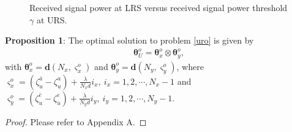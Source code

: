 \documentclass[10pt,final,doublecolumn]{IEEEtran}
\begin{document}
\begin{figure}[t!]
	\centering
	\subfigbottomskip=2pt
	\subfigcapskip=-5pt
	\caption{Received signal power at LRS versus received signal power threshold $\gamma$ at URS.}
\label{gain_N}
\end{figure}

{\bf{Proposition 1}}: The optimal solution to problem \eqref{uro} is given by
\begin{align}\label{so}
\boldsymbol{\theta}_U^o=\boldsymbol{\theta}_x^o\otimes\boldsymbol{\theta}_y^o,
\end{align}
with $\boldsymbol{\theta}_x^o=\mathbf{d}(N_x,\varsigma_x^o)$ and $\boldsymbol{\theta}_y^o
=\mathbf{d}(N_y,\varsigma_y^o)$, where
$\varsigma_x^o=(\zeta_u^{\bar{a}}-\zeta_u^{a})+\frac{\lambda}{N_x{d}}i_x,~i_x=1,2,\cdots,N_x-1$ and $\varsigma_y^o=(\zeta_u^{\bar{e}}-\zeta_u^{e})+\frac{\lambda}{N_y{d}}i_y,~i_y=1,2,\cdots,N_y-1$.
\begin{proof}
Please refer to Appendix A.
\end{proof}
\end{document}
